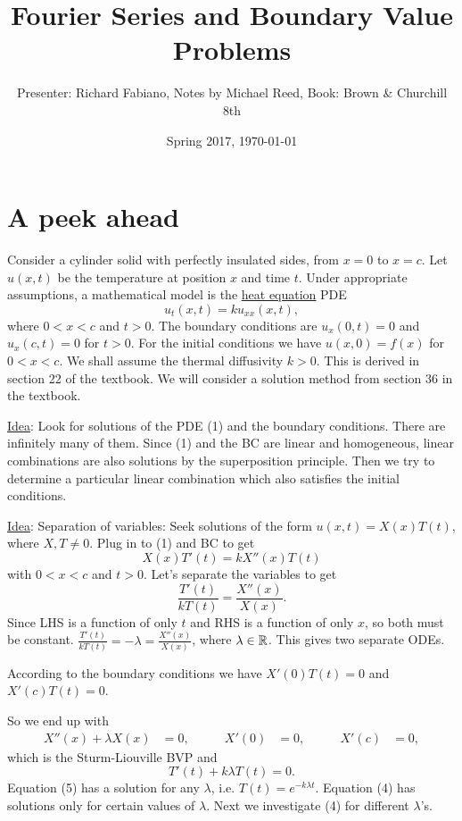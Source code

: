 \documentclass[]{article}
\author{Presenter: Richard Fabiano, Notes by Michael Reed, Book: Brown \& Churchill 8th}
\title{Fourier Series and Boundary Value Problems}
\date{Spring 2017, \today}
\begin{document}
\maketitle

\section{A peek ahead}

Consider a cylinder solid with perfectly insulated sides, from $x=0$ to $x=c$. Let $u(x,t)$ be the temperature at position $x$ and time $t$. Under appropriate assumptions, a mathematical model is the \underline{heat equation} PDE
\begin{equation}
	u_t(x,t)=k u_{xx}(x,t),
\end{equation}
where $0<x<c$ and $t>0$. The boundary conditions are $u_x(0,t)=0$ and $u_x(c,t)=0$ for $t>0$. For the initial conditions we have $u(x,0)=f(x)$ for $0<x<c$. We shall assume the thermal diffusivity $k>0$.
This is derived in section 22 of the textbook. We will consider a solution method from section 36 in the textbook.

\underline{Idea}: Look for solutions of the PDE (1) and the boundary conditions. There are infinitely many of them. Since (1) and the BC are linear and homogeneous, linear combinations are also solutions by the superposition principle. Then we try to determine a particular linear combination which also satisfies the initial conditions.

\underline{Idea}: Separation of variables: Seek solutions of the form $u(x,t)=X(x)T(t)$, where $X,T\neq 0$. Plug in to (1) and BC to get
\begin{equation}
X(x)T'(t)=kX''(x)T(t)
\end{equation}
with $0<x<c$ and $t>0$. Let's separate the variables to get
\begin{equation}
\frac{T'(t)}{kT(t)}=\frac{X''(x)}{X(x)}.
\end{equation}
Since LHS is a function of only $t$ and RHS is a function of only $x$, so both must be constant. $\frac{T'(t)}{kT(t)}=-\lambda=\frac{X''(x)}{X(x)}$, where $\lambda\in\mathbb{R}$. This gives two separate ODEs.
\begin{note}
	According to the boundary conditions we have $X'(0)T(t)=0$ and $X'(c)T(t)=0$.
\end{note}
So we end up with
\begin{align}
X''(x)+\lambda X(x)&=0, &\qquad
X'(0)&=0, &\qquad X'(c)&=0,
\end{align}
which is the Sturm-Liouville BVP and
\begin{equation}
T'(t)+k\lambda T(t)=0.
\end{equation}
Equation (5) has a solution for any $\lambda$, i.e. $T(t)=e^{-k\lambda t}$. Equation (4) has solutions only for certain values of $\lambda$. Next we investigate (4) for different $\lambda$'s.
\end{document}

